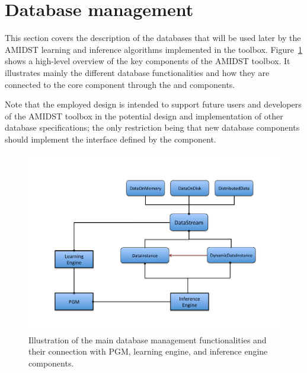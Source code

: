 \section{Database management} \label{sec:DataBases}

This section covers the description of the databases that will be used later by the AMIDST learning and inference algorithms implemented in the toolbox.  Figure~\ref{fig:DataBase} shows a high-level overview of the key components of the AMIDST toolbox. It illustrates mainly the different database functionalities and how they are connected to the core component  through the  and  components. 

Note that the employed design is intended to support future users and developers of the AMIDST toolbox in the potential design and implementation of other database specifications; the only restriction being that new database components should implement the interface defined by the  component. 

  \begin{figure}[ht!]
    \centering
    \includegraphics[width=\linewidth]{./figures/DataBase}
    \vspace{-0.5in}
    \caption{Illustration of the main database management functionalities and their connection with PGM, learning engine, and inference engine components. }
    \label{fig:DataBase}
  \end{figure}
  
